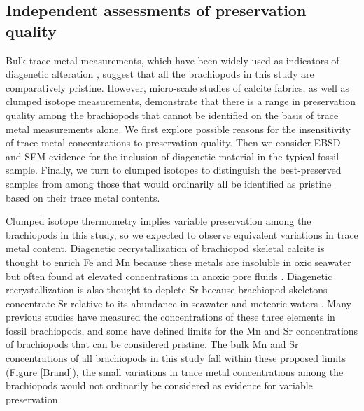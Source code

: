\documentclass[5p, authoryear]{elsarticle}
\begin{document}
\subsection{Independent assessments of preservation quality}

Bulk trace metal measurements, which have been widely used as indicators of diagenetic alteration \citep{Azmy1998, Brand2012, Came2007, Finnegan2011}, suggest that all the brachiopods in this study are comparatively pristine. However, micro-scale studies of calcite fabrics, as well as clumped isotope measurements, demonstrate that there is a range in preservation quality among the brachiopods that cannot be identified on the basis of trace metal measurements alone. We first explore possible reasons for the insensitivity of trace metal concentrations to preservation quality. Then we consider EBSD and SEM evidence for the inclusion of diagenetic material in the typical fossil sample. Finally, we turn to clumped isotopes to distinguish the best-preserved samples from among those that would ordinarily all be identified as pristine based on their trace metal contents.  

Clumped isotope thermometry implies variable preservation among the brachiopods in this study, so we expected to observe equivalent variations in trace metal content. Diagenetic recrystallization of brachiopod skeletal calcite is thought to enrich Fe and Mn because these metals are insoluble in oxic seawater but often found at elevated concentrations in anoxic pore fluids \citep{Brand1980, Shields2003}. Diagenetic recrystallization is also thought to deplete Sr because brachiopod skeletons concentrate Sr relative to its abundance in seawater and meteoric waters \citep{Brand1980, DePaolo2011, Schrag1995}. Many previous studies have measured the concentrations of these three elements in fossil brachiopods, and some have defined limits for the Mn and Sr concentrations of brachiopods that can be considered pristine. The bulk Mn and Sr concentrations of all brachiopods in this study fall within these proposed limits (Figure \ref{Brand}), the small variations in trace metal concentrations among the brachiopods would not ordinarily be considered as evidence for variable preservation. 
\end{document}
